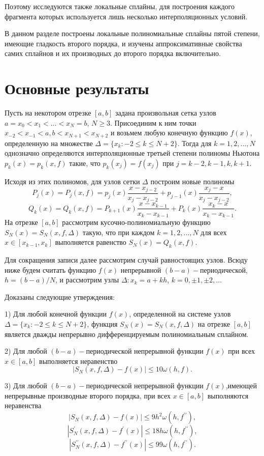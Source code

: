 Поэтому исследуются также локальные сплайны, для построения каждого фрагмента
которых используется лишь несколько интерполяционных условий.

В данном разделе построены локальные полиномиальные сплайны пятой степени,
имеющие гладкость второго порядка, и изучены аппроксимативные свойства самих
сплайнов и их производных до второго порядка включительно.


\section{Основные результаты}

Пусть на некотором отрезке $[a,b]$ задана произвольная сетка узлов
$a=x_0<x_1<\dots <x_N=b$,  $N\geqslant 3$. Присоединим к ним точки
$ x_{-2}<x_{-1}<a, b<x_{N+1}<x_{N+2}$ и возьмем любую конечную функцию $f(x)$,
определенную на множестве $\Delta=\{x_k: -2\leqslant k \leqslant N+2\}$.
Тогда для $k=1,2,\dots,N$ однозначно определяются интерполяционные третьей степени
 полиномы Ньютона $p_k (x)=p_k (x,f)$
такие, что  $p_k (x_j )=f(x_j)$ при $j=k-2,k-1,k,k+1$.

Исходя из этих полиномов, для узлов сетки $\Delta$ построим новые полиномы
$$
P_j (x)=P_j (x,f)=p_j (x) \frac{x-x_{j-2}}{x_j-x_{j-2}}+
p_{j-1}(x)\frac{x_j-x}{x_j-x_{j-2}},
$$
$$
Q_k (x)=Q_k (x,f)=P_{k+1}(x)\frac{x-x_{k-1}}{x_k-x_{k-1}}+
P_k (x)\frac{x_k-x}{x_k-x_{k-1}}.
$$
На отрезке $[a,b]$  рассмотрим кусочно-полиномиальную функцию
 $S_N (x)=S_N (x,f,\Delta)$ такую, что при каждом $k=1,2,\dots,N$
для всех $x\in [x_{k-1},x_k]$ выполняется равенство $S_N (x)=Q_k (x,f)$.

Для сокращения записи далее рассмотрим случай равностоящих узлов.
Всюду ниже будем считать функцию $f(x)$ непрерывной $(b-a)-$периодической,
$h=(b-a)/N$, и рассмотрим узлы $\Delta:x_k=a+kh$, $k=0,\pm 1,\pm 2,\dots$

Доказаны следующие утверждения:

1) Для любой конечной функции $f(x)$, определенной на системе узлов
$\Delta=\{x_k:-2\leqslant k \leqslant N+2\}$, функция
$S_N (x)=S_N (x,f,\Delta)$ на отрезке $[a,b]$
является дважды непрерывно дифференцируемым полиномиальным сплайном.

2) Для любой $(b-a)-$периодической непрерывной функции $f(x)$
при всех $x\in [a,b]$ выполняется неравенство
$$
|S_N (x,f,\Delta)-f(x)|\leqslant 10 \omega(h,f).
$$

3) Для любой $(b-a)-$периодической непрерывной функции $f(x)$,имеющей
непрерывные производные второго порядка, при всех $x\in [a,b]$ выполняются
неравенства
$$
|S_N (x,f,\Delta)-f(x)|\leqslant 9h^2 \omega(h,f^{\prime\prime}),
$$
$$
|S_N^\prime(x,f,\Delta)-f^\prime(x)|\leqslant 18h\omega(h,f^{\prime\prime}),
$$
$$
|S_N^{\prime\prime}(x,f,\Delta)-f^{\prime\prime}(x)|\leqslant 99\omega(h,f^{\prime\prime}).
$$


